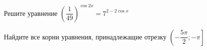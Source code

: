 \begin{ex}
	\begin{condition}
		\begin{enumcols}[label=\asbuk*)]
			\item Решите уравнение \( \left(\dfrac{1}{49}\right)^{\cos 2x} =7^{2 -2\cos x} \)
			\item Найдите все корни уравнения, принадлежащие отрезку \( \left(-\dfrac{5\pi}{2};-\pi\right] \)
		\end{enumcols}
	\end{condition}
\end{ex}